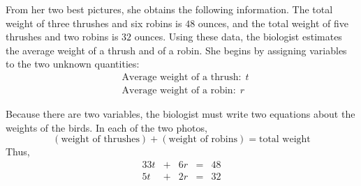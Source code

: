\documentclass[10pt,]{book}
\theoremstyle{plain}
\theoremstyle{definition}
\theoremstyle{definition}
\theoremstyle{definition}
\theoremstyle{definition}
\numberwithin{equation}{section}
\newcommand{\amp}{ & }
\begin{document}
	From her two best pictures, she obtains the following information. The total weight of three thrushes and six robins is \(48\) ounces, and the total weight of five thrushes and two robins is \(32\) ounces. Using these data, the biologist estimates the average weight of a thrush and of a robin. She begins by assigning variables to the two unknown quantities:
	\begin{align*}

			\amp\text{Average weight of a thrush:} ~~t			
		\\

			\amp\text{Average weight of a robin:} ~~r			
		
\end{align*}
%
\par

	Because there are two variables, the biologist must write two equations about the weights of the birds. In each of the two photos,
	\begin{equation*}
		(\text{weight of thrushes}) + (\text{weight of robins}) = \text{total weight}
	\end{equation*}
	Thus,
	\begin{alignat*}{3}
3t \amp {}+{} \amp  6r  {}\amp={} \amp 48\\
5t \amp {}+{} \amp 2r  {}\amp={} \amp 32
\end{alignat*}
%
\leavevmode%
\end{document}
